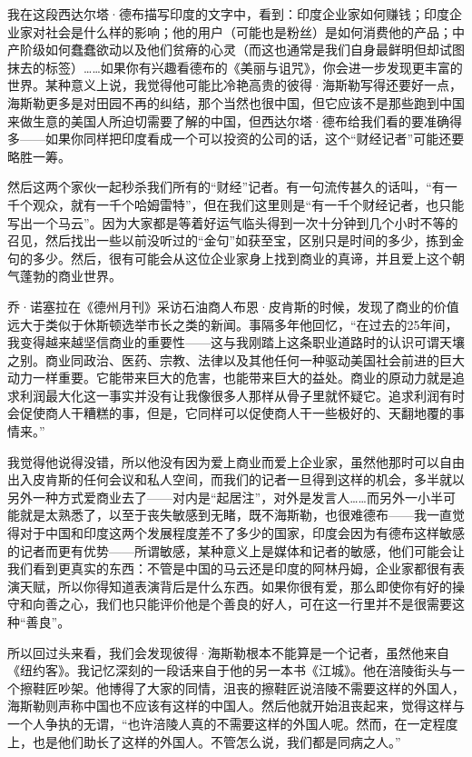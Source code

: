 我在这段西达尔塔·德布描写印度的文字中，看到：印度企业家如何赚钱；印度企业家对社会是什么样的影响；他的用户（可能也是粉丝）是如何消费他的产品；中产阶级如何蠢蠢欲动以及他们贫瘠的心灵（而这也通常是我们自身最鲜明但却试图抹去的标签）\ldots\ldots 如果你有兴趣看德布的《美丽与诅咒》，你会进一步发现更丰富的世界。某种意义上说，我觉得他可能比冷艳高贵的彼得·海斯勒写得还要好一点，海斯勒更多是对田园不再的纠结，那个当然也很中国，但它应该不是那些跑到中国来做生意的美国人所迫切需要了解的中国，但西达尔塔·德布给我们看的要准确得多------如果你同样把印度看成一个可以投资的公司的话，这个``财经记者''可能还要略胜一筹。

然后这两个家伙一起秒杀我们所有的``财经''记者。有一句流传甚久的话叫，``有一千个观众，就有一千个哈姆雷特''，但在我们这里则是``有一千个财经记者，也只能写出一个马云''。因为大家都是等着好运气临头得到一次十分钟到几个小时不等的召见，然后找出一些以前没听过的``金句''如获至宝，区别只是时间的多少，拣到金句的多少。然后，很有可能会从这位企业家身上找到商业的真谛，并且爱上这个朝气蓬勃的商业世界。

乔·诺塞拉在《德州月刊》采访石油商人布恩·皮肯斯的时候，发现了商业的价值远大于类似于休斯顿选举市长之类的新闻。事隔多年他回忆，``在过去的25年间，我变得越来越坚信商业的重要性------这与我刚踏上这条职业道路时的认识可谓天壤之别。商业同政治、医药、宗教、法律以及其他任何一种驱动美国社会前进的巨大动力一样重要。它能带来巨大的危害，也能带来巨大的益处。商业的原动力就是追求利润最大化这一事实并没有让我像很多人那样从骨子里就怀疑它。追求利润有时会促使商人干糟糕的事，但是，它同样可以促使商人干一些极好的、天翻地覆的事情来。''

我觉得他说得没错，所以他没有因为爱上商业而爱上企业家，虽然他那时可以自由出入皮肯斯的任何会议和私人空间，而我们的记者一旦得到这样的机会，多半就以另外一种方式爱商业去了------对内是``起居注''，对外是发言人\ldots\ldots 而另外一小半可能就是太熟悉了，以至于丧失敏感到无睹，既不海斯勒，也很难德布------我一直觉得对于中国和印度这两个发展程度差不了多少的国家，印度会因为有德布这样敏感的记者而更有优势------所谓敏感，某种意义上是媒体和记者的敏感，他们可能会让我们看到更真实的东西：不管是中国的马云还是印度的阿林丹姆，企业家都很有表演天赋，所以你得知道表演背后是什么东西。如果你很有爱，那么即使你有好的操守和向善之心，我们也只能评价他是个善良的好人，可在这一行里并不是很需要这种``善良''。

所以回过头来看，我们会发现彼得·海斯勒根本不能算是一个记者，虽然他来自《纽约客》。我记忆深刻的一段话来自于他的另一本书《江城》。他在涪陵街头与一个擦鞋匠吵架。他博得了大家的同情，沮丧的擦鞋匠说涪陵不需要这样的外国人，海斯勒则声称中国也不应该有这样的中国人。然后他就开始沮丧起来，觉得这样与一个人争执的无谓，``也许涪陵人真的不需要这样的外国人呢。然而，在一定程度上，也是他们助长了这样的外国人。不管怎么说，我们都是同病之人。''


